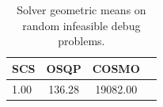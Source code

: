 \begin{table}
\centering
\caption{Solver geometric means on random infeasible debug problems.}
\label{t-random infeasible debug-geom_mean}
\begin{tabular}{lccc}
\toprule
 SCS &   OSQP &    COSMO \\
\midrule
1.00 & 136.28 & 19082.00 \\
\bottomrule
\end{tabular}
\end{table}
